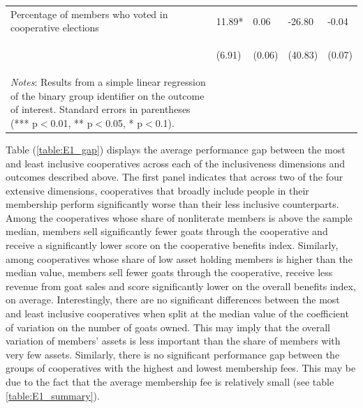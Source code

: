 \documentclass[11pt]{article}
\begin{document}
\begin{table}[H]
{\begin{tabularx}{1.5\linewidth}{lllll}
\noalign{\smallskip}Percentage of members who voted in cooperative elections & 11.89* & 0.06 & -26.80 & -0.04\\
 & \begin{footnotesize}(6.91)\end{footnotesize} & \begin{footnotesize}(0.06)\end{footnotesize} & \begin{footnotesize}(40.83)\end{footnotesize} & \begin{footnotesize}(0.07)\end{footnotesize}\\
\noalign{\smallskip}\hline
\multicolumn{5}{@{}p{1.5\linewidth}}
{\textit{Notes}: Results from a simple linear regression of the binary group identifier on the outcome of interest. Standard errors in parentheses (*** p$<$0.01, ** p$<$0.05, * p$<$0.1). }
  \end{tabularx}}
\end{table}
\doublespacing

Table (\ref{table:E1_gap}) displays the average performance gap between the most and least inclusive cooperatives across each of the inclusiveness dimensions and outcomes described above. The first panel indicates that across two of the four extensive dimensions, cooperatives that broadly include people in their membership perform significantly worse than their less inclusive counterparts. Among the cooperatives whose share of nonliterate members is above the sample median, members sell significantly fewer goats through the cooperative and receive a significantly lower score on the cooperative benefits index. Similarly, among cooperatives whose share of low asset holding members is higher than the median value, members sell fewer goats through the cooperative, receive less revenue from goat sales and score significantly lower on the overall benefits index, on average. Interestingly, there are no significant differences between the most and least inclusive cooperatives when split at the median value of the coefficient of variation on the number of goats owned. This may imply that the overall variation of members' assets is less important than the share of members with very few assets. Similarly, there is no significant performance gap between the groups of cooperatives with the highest and lowest membership fees. This may be due to the fact that the average membership fee is relatively small (see table \ref{table:E1_summary}). 
\end{document}
